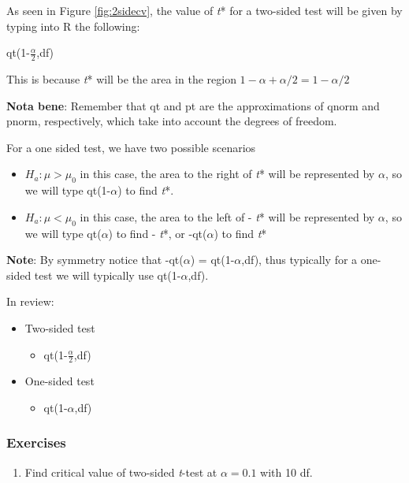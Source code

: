 \documentclass[
  openany]{book}
\providecommand{\tightlist}{%
  \setlength{\itemsep}{0pt}\setlength{\parskip}{0pt}}
\begin{document}
As seen in Figure \ref{fig:2sidecv}, the value of \emph{t}* for a two-sided test will be given by typing into R the following:

qt(1-\(\frac{\alpha}{2}\),df)

This is because \emph{t}* will be the area in the region \(1-\alpha + \alpha/2 = 1-\alpha/2\)

\textbf{Nota bene}: Remember that qt and pt are the approximations of qnorm and pnorm, respectively, which take into account the degrees of freedom.

For a one sided test, we have two possible scenarios

\begin{itemize}
\item
  \(H_a: \mu > \mu_0\) in this case, the area to the right of \emph{t}* will be represented by \(\alpha\), so we will type qt(1-\(\alpha\)) to find \emph{t}*.
\item
  \(H_a: \mu < \mu_0\) in this case, the area to the left of - \emph{t}* will be represented by \(\alpha\), so we will type qt(\(\alpha\)) to find - \emph{t}*, or -qt(\(\alpha\)) to find \emph{t}*
\end{itemize}

\textbf{Note}: By symmetry notice that -qt(\(\alpha\)) = qt(1-\(\alpha\),df), thus typically for a one-sided test we will typically use qt(1-\(\alpha\),df).

In review:

\begin{itemize}
\tightlist
\item
  Two-sided test

  \begin{itemize}
  \tightlist
  \item
    qt(1-\(\frac{\alpha}{2}\),df)
  \end{itemize}
\item
  One-sided test

  \begin{itemize}
  \tightlist
  \item
    qt(1-\(\alpha\),df)
  \end{itemize}
\end{itemize}

\subsubsection{Exercises}\label{exercises}

\begin{enumerate}
\def\labelenumi{\arabic{enumi}.}
\tightlist
\item
  Find critical value of two-sided \emph{t}-test at \(\alpha=0.1\) with 10 df.
\end{enumerate}
\end{document}
